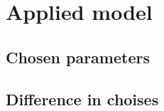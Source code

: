 \section{Applied model}\label{sec:appliedmodel}
\subsection{Chosen parameters}
\subsection{Difference in choises}